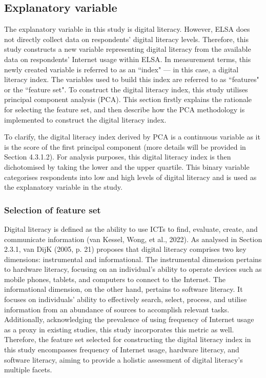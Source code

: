 \subsection{Explanatory variable}
The explanatory variable in this study is digital literacy. However, ELSA does not directly collect data on respondents' digital literacy levels. Therefore, this study constructs a new variable representing digital literacy from the available data on respondents' Internet usage within ELSA. In measurement terms, this newly created variable is referred to as an ``index" — in this case, a digital literacy index. The variables used to build this index are referred to as ``features" or the ``feature set". To construct the digital literacy index, this study utilises principal component analysis (PCA). This section firstly explains the rationale for selecting the feature set, and then describe how the PCA methodology is implemented to construct the digital literacy index.

To clarify, the digital literacy index derived by PCA is a continuous variable as it is the score of the first principal component (more details will be provided in Section 4.3.1.2). For analysis purposes, this digital literacy index is then dichotomised by taking the lower and the upper quartile. This binary variable categorises respondents into low and high levels of digital literacy and is used as the explanatory variable in the study. 

\subsubsection{Selection of feature set}
Digital literacy is defined as the ability to use ICTs to find, evaluate, create, and communicate information (van Kessel, Wong, et al., 2022). As analysed in Section 2.3.1, van DijK (2005, p. 21) proposes that digital literacy comprises two key dimensions: instrumental and informational. The instrumental dimension pertains to hardware literacy, focusing on an individual's ability to operate devices such as mobile phones, tablets, and computers to connect to the Internet. The informational dimension, on the other hand, pertains to software literacy. It focuses on individuals' ability to effectively search, select, process, and utilise information from an abundance of sources to accomplish relevant tasks. Additionally, acknowledging the prevalence of using frequency of Internet usage as a proxy in existing studies, this study incorporates this metric as well. Therefore, the feature set selected for constructing the digital literacy index in this study encompasses frequency of Internet usage, hardware literacy, and software literacy, aiming to provide a holistic assessment of digital literacy's multiple facets.

